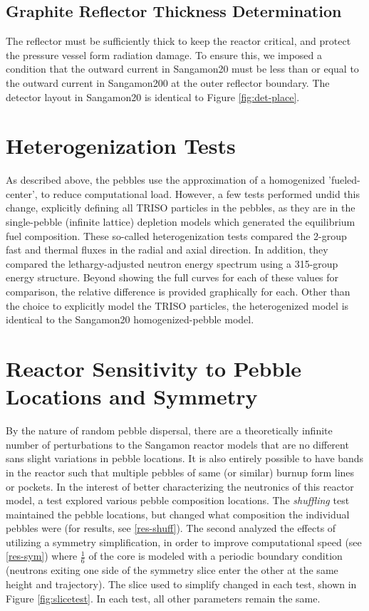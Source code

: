\subsection{Graphite Reflector Thickness Determination}

The reflector must be sufficiently thick to keep the reactor critical, and protect the pressure vessel form radiation damage.  To ensure this, we imposed a condition that the outward current in Sangamon20 must be less than or equal to the outward current in Sangamon200 at the outer reflector boundary.  The detector layout in Sangamon20 is identical to Figure \ref{fig:det-place}.


\section{Heterogenization Tests}
\label{het-test-meth}

As described above, the pebbles use the approximation of a homogenized 'fueled-center', to reduce computational load.  However, a few tests performed undid this change, explicitly defining all TRISO particles in the pebbles, as they are in the single-pebble (infinite lattice) depletion models which generated the equilibrium fuel composition.  These so-called heterogenization tests compared the 2-group fast and thermal fluxes in the radial and axial direction.  In addition, they compared the lethargy-adjusted neutron energy spectrum using a 315-group energy structure.  Beyond showing the full curves for each of these values for comparison, the relative difference is provided graphically for each.  Other than the choice to explicitly model the TRISO particles, the heterogenized model is identical to the Sangamon20 homogenized-pebble model.

\section{Reactor Sensitivity to Pebble Locations and Symmetry}
\label{meth-sens}

By the nature of random pebble dispersal, there are a theoretically infinite number of perturbations to the Sangamon reactor models that are no different sans slight variations in pebble locations.  It is also entirely possible to have bands in the reactor such that multiple pebbles of same (or similar) burnup form lines or pockets.  In the interest of better characterizing the neutronics of this reactor model, a test explored various pebble composition locations.  The \emph{shuffling} test maintained the pebble locations, but changed what composition the individual pebbles were (for results, see \autoref{res-shuff}).  The second analyzed the effects of utilizing a symmetry simplification, in order to improve computational speed (see \autoref{res-sym}) where $\frac{1}{6}$ of the core is modeled with a periodic boundary condition (neutrons exiting one side of the symmetry slice enter the other at the same height and trajectory).  The slice used to simplify changed in each test, shown in Figure \ref{fig:slicetest}.  In each test, all other parameters remain the same.

